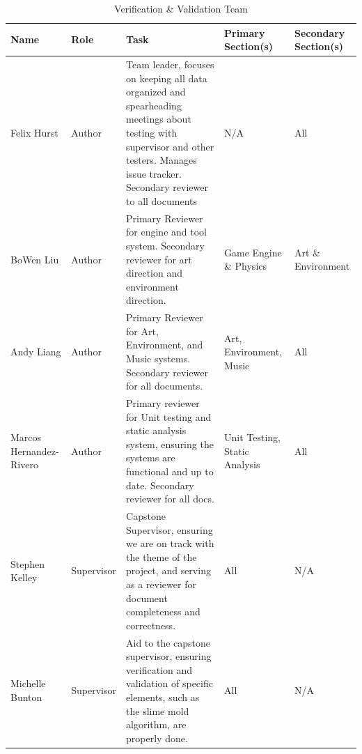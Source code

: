 \documentclass[12pt, titlepage]{article}
\begin{document}
\begin{table}[H]
\caption{Verification \& Validation Team}
\begin{tabular}{|p{2cm}|p{2cm}|p{6cm}|p{2.5cm}|p{2cm}|}
\hline
\textbf{Name}           & \textbf{Role} & \textbf{Task}                                                                                                                                                                            & \textbf{Primary Section(s)}   & \textbf{Secondary Section(s)} \\ \hline
Felix Hurst             & Author        & Team leader, focuses on keeping all data organized and spearheading meetings about testing with supervisor and other testers. Manages issue tracker. Secondary reviewer to all documents & N/A                           & All                           \\ \hline
BoWen Liu               & Author        & Primary Reviewer for engine and tool system. Secondary reviewer for art direction and environment direction.                                                                             & Game Engine \& Physics        & Art \& Environment            \\ \hline
Andy Liang              & Author        & Primary Reviewer for Art, Environment, and Music systems. Secondary reviewer for all documents.                                                                                          & Art,  Environment, Music      & All                           \\ \hline
Marcos Hernandez-Rivero & Author        & Primary reviewer for Unit testing and static analysis system, ensuring the systems are functional and up to date. Secondary reviewer for all docs.                                       & Unit Testing, Static Analysis & All                           \\ \hline
Stephen Kelley          & Supervisor    & Capstone Supervisor, ensuring we are on track with the theme of the project, and serving as a reviewer for document completeness and correctness.                                        & All                           & N/A                           \\ \hline
Michelle Bunton         & Supervisor    & Aid to the capstone supervisor, ensuring verification and validation of specific elements, such as the slime mold algorithm, are properly done.                                          & All                           & N/A                           \\ \hline
\end{tabular}
\end{table}
\end{document}
